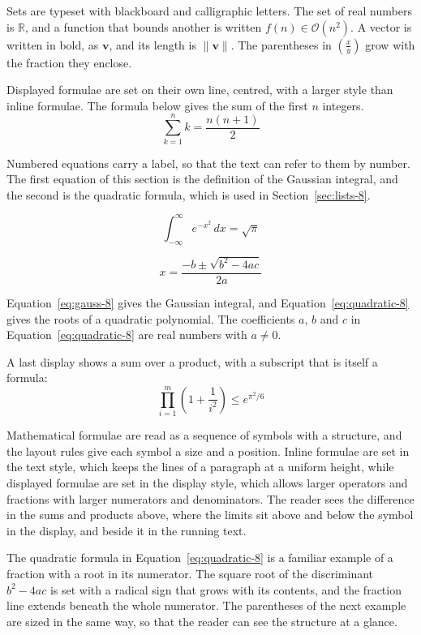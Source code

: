 \documentclass{article}
\begin{document}
Sets are typeset with blackboard and calligraphic letters. The set of real numbers is
$\mathbb{R}$, and a function that bounds another is written $f(n) \in \mathcal{O}(n^2)$.
A vector is written in bold, as $\mathbf{v}$, and its length is $\|\mathbf{v}\|$. The
parentheses in $\left( \frac{x}{y} \right)$ grow with the fraction they enclose.

Displayed formulae are set on their own line, centred, with a larger style than inline
formulae. The formula below gives the sum of the first $n$ integers.
\[
  \sum_{k=1}^{n} k = \frac{n(n+1)}{2}
\]

Numbered equations carry a label, so that the text can refer to them by number. The
first equation of this section is the definition of the Gaussian integral, and the
second is the quadratic formula, which is used in Section~\ref{sec:lists-8}.

\begin{equation}\label{eq:gauss-8}
  \int_{-\infty}^{\infty} e^{-x^{2}}\,dx = \sqrt{\pi}
\end{equation}

\begin{equation}\label{eq:quadratic-8}
  x = \frac{-b \pm \sqrt{b^{2}-4ac}}{2a}
\end{equation}

Equation~\ref{eq:gauss-8} gives the Gaussian integral, and
Equation~\ref{eq:quadratic-8} gives the roots of a quadratic polynomial. The coefficients
$a$, $b$ and $c$ in Equation~\ref{eq:quadratic-8} are real numbers with $a \neq 0$.

A last display shows a sum over a product, with a subscript that is itself a formula:
\[
  \prod_{i=1}^{m} \left( 1 + \frac{1}{i^{2}} \right) \leq e^{\pi^{2}/6}
\]

Mathematical formulae are read as a sequence of symbols with a structure, and the layout
rules give each symbol a size and a position. Inline formulae are set in the text style,
which keeps the lines of a paragraph at a uniform height, while displayed formulae are
set in the display style, which allows larger operators and fractions with larger
numerators and denominators. The reader sees the difference in the sums and products
above, where the limits sit above and below the symbol in the display, and beside it in
the running text.

The quadratic formula in Equation~\ref{eq:quadratic-8} is a familiar example of a
fraction with a root in its numerator. The square root of the discriminant
$b^{2}-4ac$ is set with a radical sign that grows with its contents, and the
fraction line extends beneath the whole numerator. The parentheses of the next example
are sized in the same way, so that the reader can see the structure at a glance.
\end{document}
